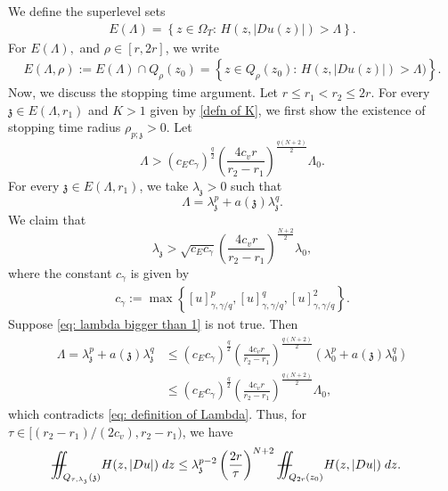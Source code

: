 \documentclass[notitlepage,11pt,reqno]{amsart}
\theoremstyle{definition}
\numberwithin{equation}{section}
\newcommand{\iintss}{{\int\hspace{-0.28cm}\int}}
\newcommand{ \miints }{{\iintss\hspace{-0.56cm} -\hspace{-0.15cm}-}}
\newcommand{\miint}[1]{{\miints_{\hspace{-0.13cm}#1}}}
\begin{document}
We define the superlevel sets
\begin{align}\label{Defn E_lambda}
E(\Lambda)=\left\{z \in \Omega_T:\, H\left(z, |Du(z)|\right)>\Lambda\right\}.
\end{align}
For $E(\Lambda),$ and $\rho\in [r,2r]$, we write
\begin{align}\label{defn_E(Lambda, rho)}
E(\Lambda,\rho):=E(\Lambda)\cap Q_{\rho}(z_0)=\left\{z \in Q_{\rho}(z_0):\, H(z, |Du(z)|)>\Lambda)\right\}.
\end{align}
Now, we discuss the stopping time argument. Let $r\leq r_1< r_2\leq 2r.$ For every $\mathfrak{z} \in E(\Lambda,r_1)$ and $K>1$ given by \eqref{defn of K},  we first show the existence of stopping time radius $\rho_{p; \mathfrak z}>0.$ Let
\begin{equation}    \label{eq: definition of Lambda}
    \Lambda >(c_Ec_{\gamma})^{\frac{q}{2}} \left(\frac{4c_v r}{r_2-r_1}\right)^\frac{q(N+2)}{2}\Lambda_0.
\end{equation}
For every $\mathfrak{z} \in E(\Lambda,r_1)$, we take $\lambda_\mathfrak{z}>0$ such that 
\begin{equation}    \label{eq: definition of lambda z}
\Lambda=\lambda_\mathfrak{z}^p+a(\mathfrak{z})\lambda_\mathfrak{z}^q.
\end{equation}
We claim that 
\begin{equation} \label{eq: lambda bigger than 1}
    \lambda_\mathfrak{z}>\sqrt{c_Ec_{\gamma}}\left(\frac{4c_v r}{r_2-r_1}\right)^\frac{N+2}{2}\lambda_0,
\end{equation}
where the constant $c_{\gamma}$ is given by
\begin{align}\label{defn of cgamma}
 c_{\gamma}:=\max\left\{[u]^p_{\gamma, \gamma/q}, [u]^q_{\gamma, \gamma/q}, [u]^2_{\gamma, \gamma/q}\right\}.   
\end{align}
Suppose \eqref{eq: lambda bigger than 1} is not true. Then 
\begin{align*}    
\Lambda=\lambda_\mathfrak{z}^p+a(\mathfrak{z})\lambda_\mathfrak{z}^q
&\leq (c_Ec_{\gamma})^{\frac{q}{2}}\left(\frac{4c_v r}{r_2-r_1}\right)^\frac{q(N+2)}{2}(\lambda_0^p+a(\mathfrak{z})\lambda_0^q)\\
&\leq (c_Ec_{\gamma})^{\frac{q}{2}}\left(\frac{4c_v r}{r_2-r_1}\right)^\frac{q(N+2)}{2}\Lambda_0,
\end{align*}
which contradicts \eqref{eq: definition of Lambda}. Thus, for $\tau\in[(r_2-r_1)/(2c_v),r_2-r_1)$, we have 
\begin{align}\label{eq : basic inequality 1 in section 5}
    \miint{Q_{\tau,\lambda_\mathfrak{z}}(\mathfrak{z})} H(z,|Du|)\; dz &\leq \lambda_\mathfrak{z}^{p-2}\left(\frac{2r}{\tau}\right)^{N+2}\miint{Q_{2r}(z_0)} H(z,|Du|)\; dz.
\end{align}
\end{document}
